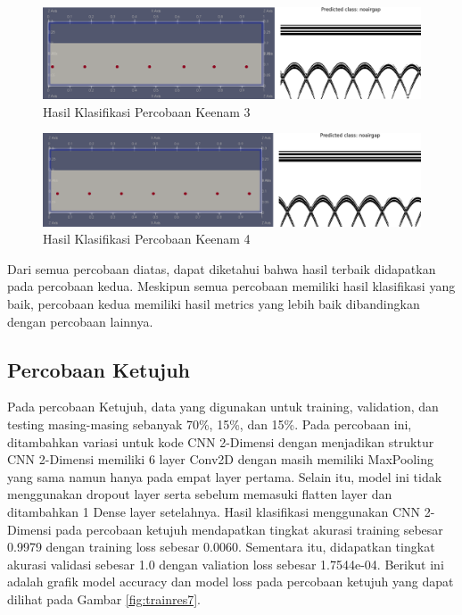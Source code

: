 \begin{figure} [H] \centering
    \includegraphics[scale=0.2]{gambar/bab4/Noarigap 19006.png}
    \caption{Hasil Klasifikasi Percobaan Keenam 3}
\end{figure}

\begin{figure} [H] \centering
    \includegraphics[scale=0.2]{gambar/bab4/Noairgap 20006.png}
    \caption{Hasil Klasifikasi Percobaan Keenam 4}
\end{figure}

Dari semua percobaan diatas, dapat diketahui bahwa hasil terbaik didapatkan pada percobaan kedua. Meskipun semua percobaan memiliki hasil klasifikasi yang baik, percobaan kedua memiliki hasil metrics yang lebih baik dibandingkan dengan percobaan lainnya.

\subsection{Percobaan Ketujuh}
Pada percobaan Ketujuh, data yang digunakan untuk training, validation, dan testing masing-masing sebanyak 70\%, 15\%, dan 15\%. Pada percobaan ini, ditambahkan variasi untuk kode CNN 2-Dimensi dengan menjadikan struktur CNN 2-Dimensi memiliki 6 layer Conv2D dengan masih memiliki MaxPooling yang sama namun hanya pada empat layer pertama. Selain itu, model ini tidak menggunakan dropout layer serta sebelum memasuki flatten layer dan ditambahkan 1 Dense layer setelahnya. Hasil klasifikasi menggunakan CNN 2-Dimensi pada percobaan ketujuh mendapatkan tingkat akurasi training sebesar 0.9979 dengan training loss sebesar 0.0060. Sementara itu, didapatkan tingkat akurasi validasi sebesar 1.0 dengan valiation loss sebesar 1.7544e-04. Berikut ini adalah grafik model accuracy dan model loss pada percobaan ketujuh yang dapat dilihat pada Gambar \ref{fig:trainres7}.

